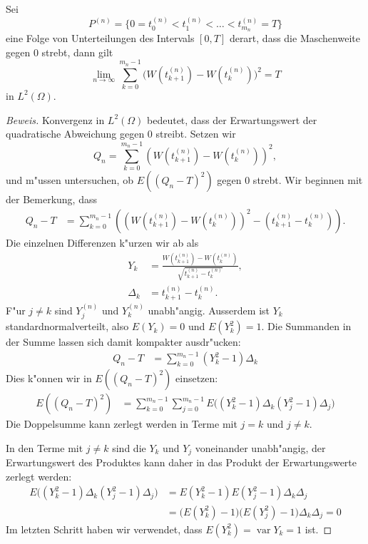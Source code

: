 \begin{hilfssatz}
\label{stochastisch:quadrvariation}
Sei
\[
P^{(n)}
=
\{0=t_0^{(n)}<t_1^{(n)}<\dots < t_{m_n}^{(n)}=T\}
\]
eine Folge von Unterteilungen des Intervals $[0,T]$ derart,
dass die Maschenweite gegen $0$ strebt, dann gilt
\[
\lim_{n\to\infty}
\sum_{k=0}^{m_n-1} \bigl(W(t_{k+1}^{(n)})-W(t_{k}^{(n)})\bigr)^2
=T
\]
in $L^2(\Omega)$.
\end{hilfssatz}

\begin{proof}[Beweis]
Konvergenz in $L^2(\Omega)$ bedeutet, dass der Erwartungswert der
quadratische Abweichung gegen $0$ streibt.
Setzen wir
\[
Q_n
= 
\sum_{k=0}^{m_n-1} \left(W(t_{k+1}^{(n)})-W(t_{k}^{(n)})\right)^2,
\]
und m"ussen untersuchen, ob $E((Q_n - T)^2)$ gegen $0$ strebt.
Wir beginnen mit der Bemerkung, dass
\begin{align*}
Q_n-T
&=
\sum_{k=0}^{m_n-1}
\left((W(t_{k+1}^{(n)})-W(t_{k}^{(n)}))^2 - (t_{k+1}^{(n)}-t_k^{(n)})\right).
\end{align*}
Die einzelnen Differenzen k"urzen wir ab als
\begin{align*}
Y_k
&=
\frac{W(t_{k+1}^{(n)})-W(t_k^{(n)})}{\sqrt{t_{k+1}^{(n)}-t_{k}^{(n)}}},
\\
\Delta_k
&=
t_{k+1}^{(n)}-t_k^{(n)}.
\end{align*}
F"ur $j\ne k$ sind $Y_j^{(n)}$ und $Y_{k}^{(n)}$ unabh"angig.
Ausserdem ist $Y_k$ standardnormalverteilt, also $E(Y_k)=0$
und $E(Y_k^2)=1$.
Die Summanden in der Summe lassen sich damit kompakter ausdr"ucken:
\begin{align*}
Q_n-T
&=
\sum_{k=0}^{m_n-1} (Y_k^2-1) \Delta_k
\end{align*}
Dies k"onnen wir in $E((Q_n-T)^2)$ einsetzen:
\begin{align*}
E((Q_n-T)^2)
&=
\sum_{k=0}^{m_n-1}
\sum_{j=0}^{m_n-1}
E\biggl(
(Y_k^2-1)\Delta_k
(Y_j^2-1)\Delta_j
\biggr)
\end{align*}
Die Doppelsumme kann zerlegt werden in Terme mit $j=k$ und $j\ne k$.

In den Terme mit $j\ne k$ sind die $Y_k$ und $Y_j$ voneinander unabh"angig,
der Erwartungswert des Produktes kann daher in das Produkt der Erwartungswerte
zerlegt werden:
\begin{align*}
E\biggl(
(Y_k^2-1)\Delta_k
(Y_j^2-1)\Delta_j
\biggr)
&=
E(Y_k^2-1)
E(Y_j^2-1)
\Delta_k
\Delta_j
\\
&=
\bigl(E(Y_k^2) -1\bigr)
\bigl(E(Y_j^2) -1\bigr)
\Delta_k
\Delta_j
=0
\end{align*}
Im letzten Schritt haben wir verwendet, dass $E(Y_k^2)=\operatorname{var}Y_k=1$
ist.


\end{proof}
